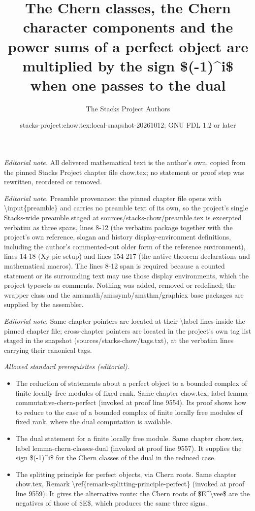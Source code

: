 \documentclass[10pt,a4paper]{amsart}
\title{The Chern classes, the Chern character components and the power sums of a perfect object are multiplied by the sign \$(-1)\textasciicircum{}i\$ when one passes to the dual}
\author{The Stacks Project Authors}
\date{stacks-project:chow.tex:local-snapshot-20261012; GNU FDL 1.2 or later}
\theoremstyle{plain}
\theoremstyle{definition}
\theoremstyle{remark}
\numberwithin{equation}{subsection}
\begin{document}
\maketitle
\noindent\textit{Editorial note.} All delivered mathematical text is the author's own, copied from the pinned Stacks Project chapter file chow.tex; no statement or proof step was rewritten, reordered or removed.\par\medskip
\noindent\textit{Editorial note.} Preamble provenance: the pinned chapter file opens with \textbackslash{}input\{preamble\} and carries no preamble text of its own, so the project's single Stacks-wide preamble staged at sources/stacks-chow/preamble.tex is excerpted verbatim as three spans, lines 8-12 (the verbatim package together with the project's own reference, slogan and history display-environment definitions, including the author's commented-out older form of the reference environment), lines 14-18 (Xy-pic setup) and lines 154-217 (the native theorem declarations and mathematical macros). The lines 8-12 span is required because a counted statement or its surrounding text may use those display environments, which the project typesets as comments. Nothing was added, removed or redefined; the wrapper class and the amsmath/amssymb/amsthm/graphicx base packages are supplied by the assembler.\par\medskip
\noindent\textit{Editorial note.} Same-chapter pointers are located at their \textbackslash{}label lines inside the pinned chapter file; cross-chapter pointers are located in the project's own tag list staged in the snapshot (sources/stacks-chow/tags.txt), at the verbatim lines carrying their canonical tags.\par\medskip
\noindent\textit{Allowed standard prerequisites (editorial).}\begin{itemize}
\item The reduction of statements about a perfect object to a bounded complex of finite locally free modules of fixed rank. Same chapter chow.tex, label lemma-commutative-chern-perfect (invoked at proof line 9554). Its proof shows how to reduce to the case of a bounded complex of finite locally free modules of fixed rank, where the dual computation is available.
\item The dual statement for a finite locally free module. Same chapter chow.tex, label lemma-chern-classes-dual (invoked at proof line 9557). It supplies the sign \$(-1)\textasciicircum{}i\$ for the Chern classes of the dual in the reduced case.
\item The splitting principle for perfect objects, via Chern roots. Same chapter chow.tex, Remark \textbackslash{}ref\{remark-splitting-principle-perfect\} (invoked at proof line 9559). It gives the alternative route: the Chern roots of \$E\textasciicircum{}\textbackslash{}vee\$ are the negatives of those of \$E\$, which produces the same three signs.
\end{itemize}\medskip
\end{document}
